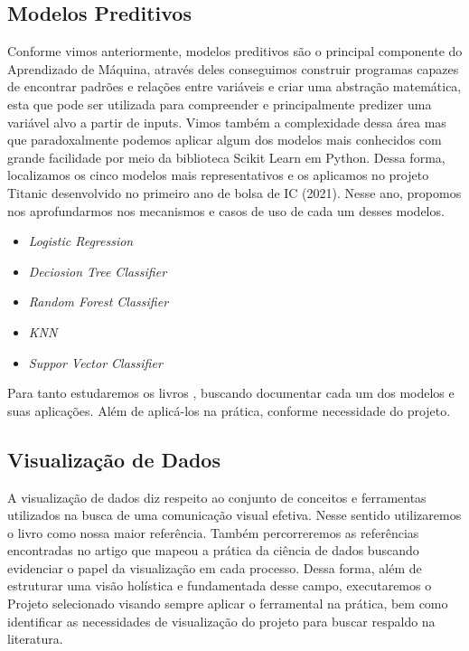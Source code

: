 \documentclass{article}
\begin{document}
\subsection{Modelos Preditivos}
Conforme vimos anteriormente, modelos preditivos são o principal componente do Aprendizado de Máquina, através deles conseguimos construir programas capazes de encontrar padrões e relações entre variáveis e criar uma abstração matemática, esta que pode ser utilizada para compreender e principalmente predizer uma variável alvo a partir de inputs. Vimos também a complexidade dessa área mas que paradoxalmente podemos aplicar algum dos modelos mais conhecidos com grande facilidade por meio da biblioteca Scikit Learn em Python. Dessa forma, localizamos os cinco modelos mais representativos e os aplicamos no projeto Titanic desenvolvido no primeiro ano de bolsa de IC (2021). 
Nesse ano, propomos nos aprofundarmos nos mecanismos e casos de uso de cada um desses modelos. 
\begin{itemize}
\item \textit{Logistic Regression}
\item \textit{Deciosion Tree Classifier}
\item \textit{Random Forest Classifier}
\item \textit{KNN}
\item \textit{Suppor Vector Classifier}
\end{itemize}

Para tanto estudaremos os livros \cite{vanderplas2016python,aurelien2017hands}, buscando documentar cada um dos modelos e suas aplicações. Além de aplicá-los na prática, conforme necessidade do projeto. 

\subsection{Visualização de Dados}
A visualização de dados diz respeito ao conjunto de conceitos e ferramentas utilizados na busca de uma comunicação visual efetiva. Nesse sentido utilizaremos o livro \cite{knaflic2015storytelling} como nossa maior referência. Também percorreremos as referências encontradas no artigo \cite{BATON} que mapeou a prática da ciência de dados buscando evidenciar o papel da visualização em cada processo. 
Dessa forma, além de estruturar uma visão holística e fundamentada desse campo, executaremos o Projeto selecionado visando sempre aplicar o ferramental na prática, bem como identificar as necessidades de visualização do projeto para buscar respaldo na literatura.
 
\end{document}
